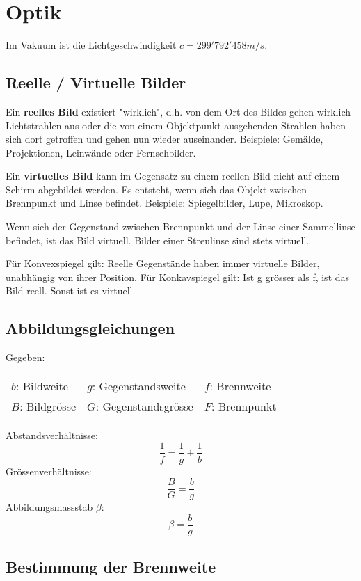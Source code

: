 \section{Optik}

Im Vakuum ist die Lichtgeschwindigkeit $c = 299'792'458 m/s$.

\subsection{Reelle / Virtuelle Bilder}

Ein \textbf{reelles Bild} existiert "wirklich", d.h. von dem Ort des Bildes
gehen wirklich Lichtstrahlen aus oder die von einem Objektpunkt ausgehenden
Strahlen haben sich dort getroffen und gehen nun wieder auseinander. Beispiele:
Gemälde, Projektionen, Leinwände oder Fernsehbilder.

Ein \textbf{virtuelles Bild} kann im Gegensatz zu einem reellen Bild nicht auf
einem Schirm abgebildet werden. Es entsteht, wenn sich das Objekt zwischen
Brennpunkt und Linse befindet. Beispiele: Spiegelbilder, Lupe, Mikroskop.

Wenn sich der Gegenstand zwischen Brennpunkt und der Linse einer Sammellinse befindet, ist das Bild virtuell. Bilder einer Streulinse sind stets virtuell.

Für Konvexspiegel gilt: Reelle Gegenstände haben immer virtuelle Bilder, unabhängig von ihrer Position.
Für Konkavspiegel gilt: Ist g grösser als f, ist das Bild reell. Sonst ist es virtuell.

\subsection{Abbildungsgleichungen}

Gegeben:

\begin{tabular}{lll}
	$b$: Bildweite & $g$: Gegenstandsweite & $f$: Brennweite \\
	$B$: Bildgrösse & $G$: Gegenstandsgrösse & $F$: Brennpunkt
\end{tabular}

Abstandsverhältnisse:
\[
	\frac{1}{f} = \frac{1}{g} + \frac{1}{b}
\]
Grössenverhältnisse:
\[
	\frac{B}{G} = \frac{b}{g}
\]
Abbildungsmassstab $\beta$:
\[
	\beta = \frac{b}{g}
\]

\subsection{Bestimmung der Brennweite}


